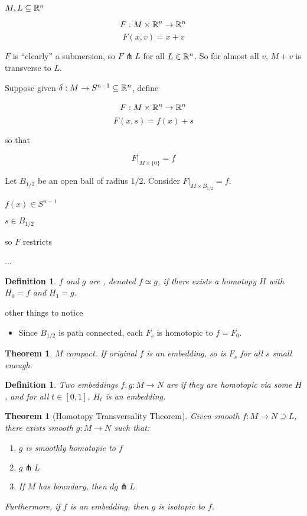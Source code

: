 \documentclass[11pt]{amsbook}
\theoremstyle{mystyle} \newtheorem{thrm}[thm]{Theorem}
\theoremstyle{mystyle} \newtheorem{defi}[thm]{Definition}
\theoremstyle{mystyle} \newtheorem{coro}[thm]{Corollary}
\theoremstyle{mystyle} \newtheorem{propo}[thm]{Proposition}
\theoremstyle{mystyle} \newtheorem{lemm}[thm]{Lemma}
\numberwithin{thm}{section}
\newcommand{\homotopic}{\simeq}
\newcommand{\transverse}{\pitchfork}
\newcommand{\x}{\times}
\begin{document}
\begin{example}
	$M, L \subseteq {\mathbb R}^n$

	$$F: M \x \R^n \to \R^n$$
	$$F(x,v) = x+v$$

	$F$ is ``clearly'' a submersion, so $F \transverse L$ for all $L \in {\mathbb R}^n$.  So for almost all $v$, $M+v$ is transverse to $L$.
\end{example}

\begin{example}
	Suppose given $\delta: M \to S^{n-1} \subseteq {\mathbb R}^n$, define

	$$\overset{~}{F}: M \x \R^n \to \R^n$$
	$$\overset{~}{F}(x,s) = f(x) + s$$

	so that

	$$\overset{~}{F}|_{M \x \{0\}} = f$$

	Let $B_{1/2}$ be an open ball of radius $1/2$.
	Consider $\overset{~}{F}|_{M \x B_{1/2}} = f$.

	$f(x) \in S^{n-1}$

	$s \in B_{1/2}$

	so $\overset{~}{F}$ restricts

	...




\begin{defi}
	$f$ and $g$ are , denoted $f \homotopic g$, if there exists a homotopy $H$ with $H_0 = f$ and $H_1 = g$.
\end{defi}
other things to notice
\begin{itemize}
	\item Since $B_{1/2}$ is path connected, each $F_s$ is homotopic to $f = F_0$.
\end{itemize}
\end{example}
\begin{thrm}
	$M$ compact.
	If original $f$ is an embedding, so is $F_s$ for all $s$ small enough.
\end{thrm}
\begin{defi}
	Two embeddings $f,g : M \to N$ are  if they are homotopic via some $H$, and for all $t \in [0,1]$, $H_t$ is an embedding.
\end{defi}
\begin{thrm}[Homotopy Transversality Theorem]
	Given smooth $f: M \to N \supseteq L$, there exists smooth $g: M \to N$ such that:
	\begin{enumerate}
		\item $g$ is smoothly homotopic to $f$
		\item $g \transverse L$
		\item If $M$ has boundary, then $dg \transverse L$
	\end{enumerate}
	Furthermore, if $f$ is an embedding, then $g$ is isotopic to $f$.
\end{thrm}
\end{document}
